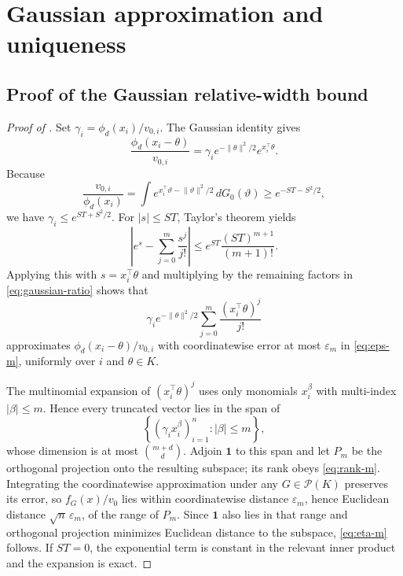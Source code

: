 \documentclass[11pt]{article}
\theoremstyle{definition}
\theoremstyle{remark}
\newcommand{\Pcal}{\mathcal P}
\newcommand{\one}{\bm 1}
\newcommand{\norm}[1]{\lVert #1\rVert}
\newcommand{\abs}[1]{\lvert #1\rvert}
\newcommand{\eps}{\varepsilon}
\begin{document}
\section{Gaussian approximation and uniqueness}
\label{app:gaussian}

\subsection{Proof of the Gaussian relative-width bound}

\begin{proof}[Proof of ]
Set $\gamma_i=\phi_d(x_i)/v_{0,i}$.  The
Gaussian identity gives
\begin{equation}\label{eq:gaussian-ratio}
 \frac{\phi_d(x_i-\theta)}{v_{0,i}}
 =\gamma_i e^{-\norm{\theta}^2/2}e^{x_i^\top\theta}.
\end{equation}
Because
\[
 \frac{v_{0,i}}{\phi_d(x_i)}
 =\int e^{x_i^\top\vartheta-\norm{\vartheta}^2/2}\,dG_0(\vartheta)
 \ge e^{-ST-S^2/2},
\]
we have $\gamma_i\le e^{ST+S^2/2}$.  For $\abs{s}\le ST$, Taylor's theorem
yields
\[
 \left|e^s-\sum_{j=0}^m\frac{s^j}{j!}\right|
 \le e^{ST}\frac{(ST)^{m+1}}{(m+1)!}.
\]
Applying this with $s=x_i^\top\theta$ and multiplying by the remaining
factors in \eqref{eq:gaussian-ratio} shows that
\[
 \gamma_i e^{-\norm{\theta}^2/2}
 \sum_{j=0}^m\frac{(x_i^\top\theta)^j}{j!}
\]
approximates $\phi_d(x_i-\theta)/v_{0,i}$ with coordinatewise error at most
$\eps_m$ in \eqref{eq:eps-m}, uniformly over $i$ and $\theta\in K$.

The multinomial expansion of
$(x_i^\top\theta)^j$ uses only monomials $x_i^\beta$ with multi-index
$\abs{\beta}\le m$.  Hence every truncated vector lies in the span of
\[
 \left\{(\gamma_ix_i^\beta)_{i=1}^n:\abs{\beta}\le m\right\},
\]
whose dimension is at most $\binom{m+d}{d}$.  Adjoin $\one$ to this span and
let $P_m$ be the orthogonal projection onto the resulting subspace; its rank
obeys \eqref{eq:rank-m}.  Integrating the coordinatewise approximation under
any $G\in\Pcal(K)$ preserves its error, so $f_G(x)/v_0$ lies within
coordinatewise distance $\eps_m$, hence Euclidean distance
$\sqrt n\,\eps_m$, of the range of $P_m$.  Since
$\one$ also lies in that range and orthogonal projection minimizes Euclidean
distance to the subspace, \eqref{eq:eta-m} follows.  If $ST=0$, the
exponential term is constant in the relevant inner product and the expansion
is exact.
\end{proof}
\end{document}
